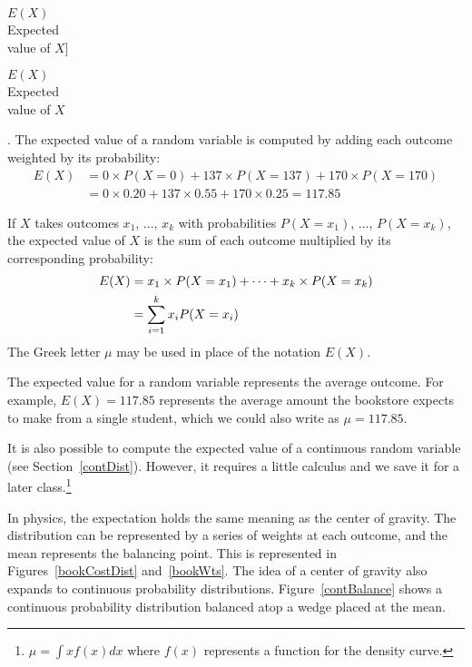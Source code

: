 $E(X)$\vspace{1mm}\\\footnotesize Expected\\value of $X$]{\raggedright\vspace{-3mm}

$E(X)$\vspace{1mm}\\\footnotesize Expected\\value of $X$}. The expected value of a random variable is computed by adding each outcome weighted by its probability:
\begin{align*}
E(X) &= 0 \times  P(X=0) + 137 \times  P(X=137) + 170 \times  P(X=170) \\
	&= 0 \times  0.20 + 137 \times  0.55 + 170 \times  0.25 = 117.85
\end{align*}

\begin{termBox}{
If $X$ takes outcomes $x_1$, ..., $x_k$ with probabilities $P(X=x_1)$, ..., $P(X=x_k)$, the expected value of $X$ is the sum of each outcome multiplied by its corresponding probability:
\begin{align}
E(X) 	&= x_1\times P(X=x_1) + \cdots + x_k\times P(X=x_k) \notag \\
	&= \sum_{i=1}^{k}x_iP(X=x_i)
\end{align}
The Greek letter $\mu$ may be used in place of the notation $E(X)$.}
\end{termBox}

The expected value for a random variable represents the average outcome. For example, $E(X)=117.85$ represents the average amount the bookstore expects to make from a single student, which we could also write as $\mu=117.85$.

It is also possible to compute the expected value of a continuous random variable (see Section~\ref{contDist}). However, it requires a little calculus and we save it for a later class.\footnote{$\mu = \int xf(x)dx$ where $f(x)$ represents a function for the density curve.}

In physics, the expectation holds the same meaning as the center of gravity. The distribution can be represented by a series of weights at each outcome, and the mean represents the balancing point. This is represented in Figures~\ref{bookCostDist} and~\ref{bookWts}. The idea of a center of gravity also expands to continuous probability distributions. Figure~\ref{contBalance} shows a continuous probability distribution balanced atop a wedge placed at the mean.

